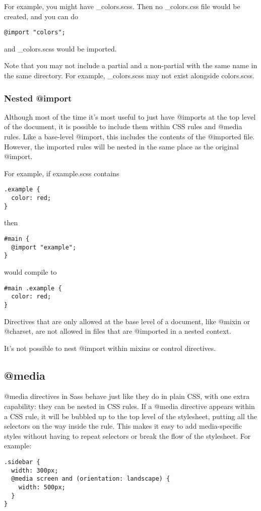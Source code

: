 \documentclass[9pt]{article}
\begin{document}
 For example, you might have \_colors.scss. Then no \_colors.css file would be created, and you can do
\begin{verbatim}
@import "colors";
\end{verbatim}


 and \_colors.scss would be imported.


 Note that you may not include a partial and a non-partial with the same name in the same directory. For example, \_colors.scss may not exist alongside colors.scss.
\subsubsection{Nested @import}


 Although most of the time it’s most useful to just have @imports at the top level of the document, it is possible to include them within CSS rules and @media rules. Like a base-level @import, this includes the contents of the @imported file. However, the imported rules will be nested in the same place as the original @import.


 For example, if example.scss contains
\begin{verbatim}
.example {
  color: red;
}
\end{verbatim}


 then
\begin{verbatim}
#main {
  @import "example";
}
\end{verbatim}


 would compile to
\begin{verbatim}
#main .example {
  color: red;
}
\end{verbatim}


 Directives that are only allowed at the base level of a document, like @mixin or @charset, are not allowed in files that are @imported in a nested context.


 It’s not possible to nest @import within mixins or control directives.
\subsection{@media}


 @media directives in Sass behave just like they do in plain CSS, with one extra capability: they can be nested in CSS rules. If a @media directive appears within a CSS rule, it will be bubbled up to the top level of the stylesheet, putting all the selectors on the way inside the rule. This makes it easy to add media-specific styles without having to repeat selectors or break the flow of the stylesheet. For example:
\begin{verbatim}
.sidebar {
  width: 300px;
  @media screen and (orientation: landscape) {
    width: 500px;
  }
}
\end{verbatim}
\end{document}
